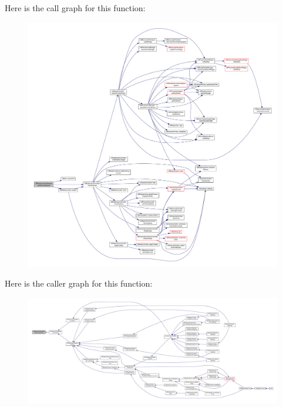 Here is the call graph for this function\-:
\nopagebreak
\begin{figure}[H]
\begin{center}
\leavevmode
\includegraphics[width=350pt]{dd/dd5/class_u_b_graphics_item_delegate_ae05eb9447f89914dd9a19bab0d8b0ef0_cgraph}
\end{center}
\end{figure}




Here is the caller graph for this function\-:
\nopagebreak
\begin{figure}[H]
\begin{center}
\leavevmode
\includegraphics[width=350pt]{dd/dd5/class_u_b_graphics_item_delegate_ae05eb9447f89914dd9a19bab0d8b0ef0_icgraph}
\end{center}
\end{figure}


